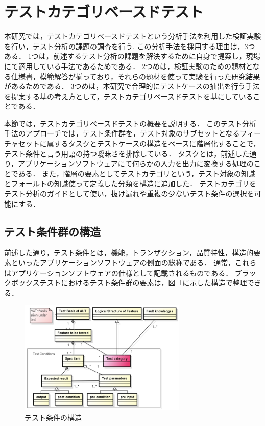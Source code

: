 \section{テストカテゴリベースドテスト}
本研究では，テストカテゴリベースドテストという分析手法を利用した検証実験を行い，テスト分析の課題の調査を行う\cite{yumoto2013test}.
この分析手法を採用する理由は，3つある．
1つは，前述するテスト分析の課題を解決するために自身で提案し，現場にて適用している手法であるためである．
2つめは，検証実験のための題材となる仕様書，模範解答が揃っており，それらの題材を使って実験を行った研究結果があるためである．
3つめは，本研究で合理的にテストケースの抽出を行う手法を提案する基の考え方として，テストカテゴリベースドテストを基にしていることである．

本節では，テストカテゴリベースドテストの概要を説明する．
このテスト分析手法のアプローチでは，テスト条件群を，テスト対象のサブセットとなるフィーチャセットに属するタスクとテストケースの構造をベースに階層化することで，テスト条件と言う用語の持つ曖昧さを排除している．
タスクとは，前述した通り，アプリケーションソフトウェアにて何らかの入力を出力に変換する処理のことである．
また，階層の要素としてテストカテゴリという，テスト対象の知識とフォールトの知識使って定義した分類を構造に追加した．
テストカテゴリをテスト分析のガイドとして使い，抜け漏れや重複の少ないテスト条件の選択を可能にする．

\subsection{テスト条件群の構造}
前述した通り，テスト条件とは，機能，トランザクション，品質特性，構造的要素といったアプリケーションソフトウェアの側面の総称である．
通常，これらはアプリケーションソフトウェアの仕様として記載されるものである．
ブラックボックステストにおけるテスト条件群の要素は，図~\ref{fig:D-4-Fig4}に示した構造で整理できる．

\begin{figure}[htbp]
  \begin{center}
  \includegraphics[width=8cm]{./image/D-4-Fig4.png}
  \caption{テスト条件の構造}
  \label{fig:D-4-Fig4}
  \end{center}
   \end{figure}


